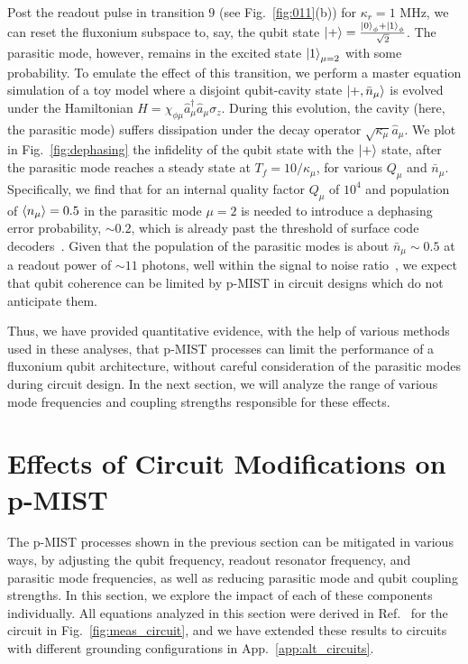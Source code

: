 \documentclass[%
reprint,
superscriptaddress,
 amsmath,amssymb,
 aps,
 prx,
longbibliography,
floatfix,
]{revtex4-2}
\begin{document}
Post the readout pulse in transition $9$ (see Fig.~\ref{fig:011}(b)) for $\kappa_r=1$ MHz, we can reset the fluxonium subspace to, say, the qubit state $\ket{+}=\frac{\ket{0}_\phi+\ket{1}_\phi}{\sqrt{2}}$. The parasitic mode, however, remains in the excited state $\ket{1}_{\mu=2}$ with some probability.
To emulate the effect of this transition, we perform a master equation simulation of a toy model where a disjoint qubit-cavity state $\ket{+,\bar n_\mu}$ is evolved under the Hamiltonian $H=\chi_{\phi\mu} \hat a_\mu^\dagger \hat a_\mu \sigma_z$. During this evolution, the cavity (here, the parasitic mode) suffers dissipation under the decay operator $\sqrt{\kappa_\mu}\hat a_\mu$. We plot in Fig.~\ref{fig:dephasing} the infidelity of the qubit state with the $\ket{+}$ state, after the parasitic mode reaches a steady state at $T_f=10/\kappa_\mu$, for various $Q_\mu$ and $\bar n_\mu$. Specifically, we find that for an internal quality factor $Q_\mu$ of $10^{4}$ and population of $\braket{n_\mu}=0.5$ in the parasitic mode $\mu=2$ is needed to introduce a dephasing error probability, $\sim 0.2$, which is already past the threshold of surface code decoders~\cite{fowler2012surface}. Given that the population of the parasitic modes is about $\bar n_\mu\sim 0.5$ at a readout power of $\sim 11$ photons, well within the signal to noise ratio~\cite{gusenkova2021quantum}, we expect that qubit coherence can be limited by p-MIST in circuit designs which do not anticipate them.

Thus, we have provided quantitative evidence, with the help of various methods used in these analyses, that p-MIST processes can limit the performance of a fluxonium qubit architecture, without careful consideration of the parasitic modes during circuit design. In the next section, we will analyze the range of various mode frequencies and coupling strengths responsible for these effects.

\section{Effects of Circuit Modifications on p-MIST}\label{sec:expressions}
The p-MIST processes shown in the previous section can be mitigated in various ways, by adjusting the qubit frequency, readout resonator frequency, and parasitic mode frequencies, as well as reducing parasitic mode and qubit coupling strengths. In this section, we explore the impact of each of these components individually. All equations analyzed in this section were derived in Ref.~\cite{viola2015collective} for the circuit in Fig.~\ref{fig:meas_circuit}, and we have extended these results to circuits with different grounding configurations in App.~\ref{app:alt_circuits}.
\end{document}
